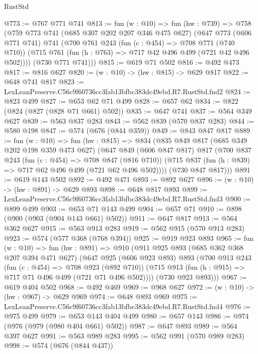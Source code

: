 \begin{lexlean}{RustStd}
\begin{coremodule}
@773 := @767 @771 @741
@813 := fun (w : @10) =>
  fun (hw : @739) =>
  @758
    (@759
      @773
      @741
      (@685 @307 @202 @207 @346 @475 @627)
      (@647
        @773
        (@606 @771 @741)
        @741
        (@700
          @761
          @243
          (fun (c : @454) => @708 @771 (@740 @710))
          (@715 @761 (fun (h : @763) => @717 @42 @496 @499 (@721 @42 @496 @502))))
        (@730 @771 @741)))
@815 := @619 @71 @502
@816 := @492 @473
@817 := @816 @627
@820 := (w : @10) -> (hw : @815) -> @629 @817
@822 := @648 @741 @817
@823 := LexLeanPreserve.C56c9f60736cc3fab13bfbc383dc49ebd.R7.RustStd.fnd2
@824 := @823 @499
@827 := @653 @62 @71 @499
@828 := @657 @62
@834 := @822 (@824 (@827 (@828 @71 @661) @502))
@835 := @647 @741
@837 := @564 @349 @627
@839 := @563 @837 @283
@843 := @562 @839 (@570 @837 @283)
@844 := @580 @198
@847 := @574 (@676 (@844 @359))
@849 := @843 @847 @817
@889 := fun (w : @10) =>
  fun (hw : @815) =>
  @834
    (@835
      @849
      @817
      (@685 @349 @202 @198 @359 @473 @627)
      (@647
        @849
        (@606 @847 @817)
        @817
        (@700
          @837
          @243
          (fun (c : @454) => @708 @847 (@816 @710))
          (@715 @837 (fun (h : @839) => @717 @62 @496 @499 (@721 @62 @496 @502))))
        (@730 @847 @817)))
@891 := @619 @143 @502
@892 := @492 @471
@893 := @892 @627
@896 := (w : @10) -> (hw : @891) -> @629 @893
@898 := @648 @817 @893
@899 := LexLeanPreserve.C56c9f60736cc3fab13bfbc383dc49ebd.R7.RustStd.fnd3
@900 := @899 @499
@903 := @653 @71 @143 @499
@904 := @657 @71
@910 := @898 (@900 (@903 (@904 @143 @661) @502))
@911 := @647 @817
@913 := @564 @362 @627
@915 := @563 @913 @283
@919 := @562 @915 (@570 @913 @283)
@923 := @574 (@577 @368 (@768 @394))
@925 := @919 @923 @893
@965 := fun (w : @10) =>
  fun (hw : @891) =>
  @910
    (@911
      @925
      @893
      (@685 @362 @368 @207 @394 @471 @627)
      (@647
        @925
        (@606 @923 @893)
        @893
        (@700
          @913
          @243
          (fun (c : @454) => @708 @923 (@892 @710))
          (@715 @913 (fun (h : @915) => @717 @71 @496 @499 (@721 @71 @496 @502))))
        (@730 @923 @893)))
@967 := @619 @404 @502
@968 := @492 @469
@969 := @968 @627
@972 := (w : @10) -> (hw : @967) -> @629 @969
@974 := @648 @893 @969
@975 := LexLeanPreserve.C56c9f60736cc3fab13bfbc383dc49ebd.R7.RustStd.fnd4
@976 := @975 @499
@979 := @653 @143 @404 @499
@980 := @657 @143
@986 := @974 (@976 (@979 (@980 @404 @661) @502))
@987 := @647 @893
@989 := @564 @397 @627
@991 := @563 @989 @283
@995 := @562 @991 (@570 @989 @283)
@998 := @574 (@676 (@844 @437))

\end{coremodule}
\end{lexlean}
